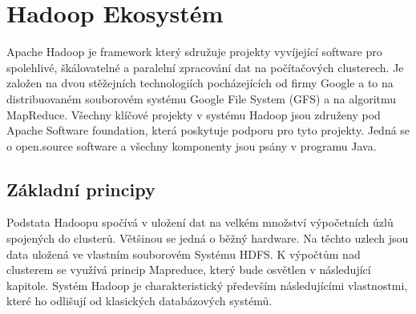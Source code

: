 \documentclass[thesis=M,czech]{FITthesis}[2012/06/26]
\begin{document}
\section{Hadoop Ekosystém}
Apache Hadoop je framework který sdružuje projekty  vyvíjející software pro spolehlivé, škálovatelné a paralelní zpracování dat na počítačových clusterech. Je založen na dvou stěžejních  technologiích pocházejících od firmy Google  a to na distribuovaném souborovém systému Google File System (GFS) a na algoritmu MapReduce\cite{HadoopDum}. Všechny klíčové projekty v systému Hadoop jsou združeny  pod Apache Software foundation, která poskytuje podporu pro tyto projekty. Jedná se o open.source software a všechny komponenty jsou psány v programu Java.

\subsection{Základní principy}
Podstata Hadoopu spočívá v uložení dat na velkém množství výpočetních úzlů spojených do clusterů. Většinou se jedná o běžný hardware. Na těchto uzlech jsou data uložená ve vlastním souborovém Systému HDFS. K výpočtům nad clusterem se využívá princip Mapreduce, který bude osvětlen v následující kapitole. Systém Hadoop je charakteristický především následujícími vlastnostmi, které ho odlišují od klasických databázových systémů.
\end{document}
